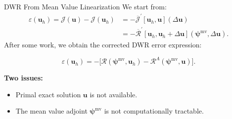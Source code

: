 \documentclass{beamer}
\newcounter{sectionframecount}
\begin{document}
\begin{frame}[t]{DWR From Mean Value Linearization}
  We start from:
  \begin{equation}
    \begin{split}
        \varepsilon(\boldsymbol{u}_h) = \mathcal{J}(\boldsymbol{u}) - \mathcal{J}(\boldsymbol{u}_h) &=
        -\overline{\mathcal{J}}^\prime[\boldsymbol{u}_h,\boldsymbol{u}](\Delta \boldsymbol{u})\\
        &=-\overline{\mathcal{R}}^\prime[\boldsymbol{u}_h,\boldsymbol{u}_h + \Delta \boldsymbol{u}](\boldsymbol{\psi}^\text{mv},\Delta \boldsymbol{u}).
    \end{split}
    \end{equation}
After some work, we obtain the corrected DWR error expression:

\begin{equation}
  \varepsilon(\boldsymbol{u}_h) = -\Big[\mathcal{R}(\boldsymbol{\psi}^\text{mv},\boldsymbol{u}_h) - \mathcal{R}^A(\boldsymbol{\psi}^\text{mv},\boldsymbol{u})\Big].
  \label{e:dwr_corrected_exact}
\end{equation}

\vspace{10pt}
\textbf{Two issues:}

\begin{itemize}
  \item Primal exact solution $\boldsymbol{u}$ is not available.
  \item The mean value adjoint $\boldsymbol{\psi}^{\text{mv}}$ is not computationally tractable.
\end{itemize}

\end{frame}

\end{document}
